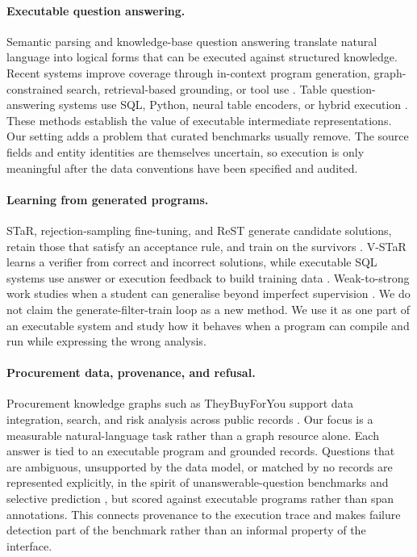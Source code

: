 \documentclass{article}
\begin{document}
\paragraph{Executable question answering.}
Semantic parsing and knowledge-base question answering translate natural
language into logical forms that can be executed against structured knowledge.
Recent systems improve coverage through in-context program generation,
graph-constrained search, retrieval-based grounding, or tool use
\citep{cheng2023binder,gu2023pangu,luo2024chatkbqa,luo2024rog,jiang2023structgpt}.
Table question-answering systems use SQL, Python, neural table encoders, or
hybrid execution \citep{pasupat2015compositional,herzig2020tapas,yin2020tabert,
liu2022tapex,jiang2022omnitab,ye2023dater,ni2023lever,wang2024chainoftable}.
These methods establish the value of executable intermediate representations.
Our setting adds a problem that curated benchmarks usually remove. The source
fields and entity identities are themselves uncertain, so execution is only
meaningful after the data conventions have been specified and audited.

\paragraph{Learning from generated programs.}
STaR, rejection-sampling fine-tuning, and ReST generate candidate solutions,
retain those that satisfy an acceptance rule, and train on the survivors
\citep{zelikman2022star,yuan2023scaling,gulcehre2023rest}. V-STaR learns a
verifier from correct and incorrect solutions, while executable SQL systems
use answer or execution feedback to build training data
\citep{vstar2024,zhang2025exesql}. Weak-to-strong work studies when a student
can generalise beyond imperfect supervision \citep{burns2024weak}. We do not
claim the generate-filter-train loop as a new method. We use it as one part of
an executable system and study how it behaves when a program can compile and
run while expressing the wrong analysis.

\paragraph{Procurement data, provenance, and refusal.}
Procurement knowledge graphs such as TheyBuyForYou support data integration,
search, and risk analysis across public records \citep{soylu2022theybuyforyou}.
Our focus is a measurable natural-language task rather than a graph resource
alone. Each answer is tied to an executable program and grounded records.
Questions that are ambiguous, unsupported by the data model, or matched by no
records are represented explicitly, in the spirit of unanswerable-question
benchmarks and selective prediction \citep{rajpurkar2018know,kamath2020selective},
but scored against executable programs rather than span annotations. This connects provenance to the execution
trace and makes failure detection part of the benchmark rather than an
informal property of the interface.
\end{document}
